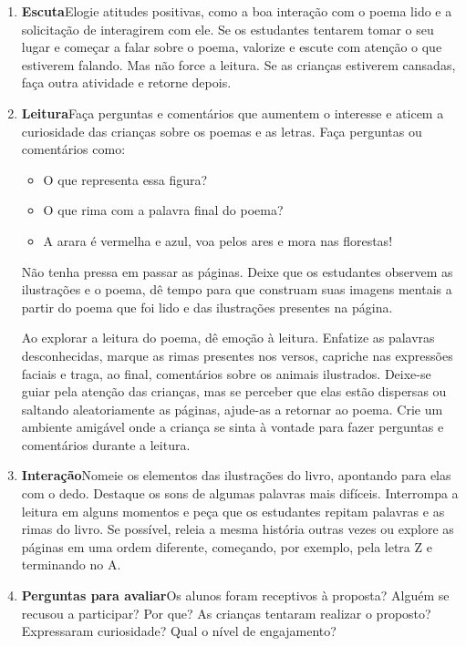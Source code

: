 \documentclass[11pt]{extarticle}
\begin{document}
\begin{enumerate}
\item \textbf{Escuta}\quad Elogie atitudes positivas, como 
a boa interação com o poema lido e a solicitação de interagirem com ele. Se os estudantes tentarem 
tomar o seu lugar e começar a falar sobre o poema, valorize e escute com atenção o que estiverem falando. Mas não 
force a leitura. Se as crianças estiverem cansadas, faça outra atividade 
e retorne depois. 



\item \textbf{Leitura}\quad Faça perguntas e comentários que aumentem o 
interesse e aticem a curiosidade das crianças sobre os poemas e as letras. Faça 
perguntas ou comentários como: 

\begin{itemize}
\item O que representa essa figura?
\item O que rima com a palavra final do poema?
\item A arara é vermelha e azul, voa pelos ares e mora nas florestas!
\end{itemize}

Não tenha pressa em passar as páginas. Deixe que os estudantes 
observem as ilustrações e o poema, dê tempo para que construam suas imagens 
mentais a partir do poema que foi lido e das ilustrações presentes na página. 

Ao explorar a leitura do poema, dê emoção 
à leitura. Enfatize as palavras desconhecidas, marque as rimas presentes nos versos,
capriche nas expressões faciais e traga, ao final, comentários sobre os animais ilustrados.
Deixe-se guiar pela atenção das crianças, mas se perceber que 
elas estão dispersas ou saltando aleatoriamente as páginas, ajude-as 
a retornar ao poema. Crie um ambiente amigável onde a criança 
se sinta à vontade para fazer perguntas e comentários durante a leitura.

\item \textbf{Interação}\quad Nomeie os elementos das ilustrações 
do livro, apontando para elas com o dedo. Destaque os sons de algumas 
palavras mais difíceis. Interrompa a leitura em alguns momentos e peça que 
os estudantes repitam palavras e as rimas do livro. Se possível, 
releia a mesma história outras vezes ou explore as páginas em uma ordem 
diferente, começando, por exemplo, pela letra Z e terminando no A. 

\item \textbf{Perguntas para avaliar}\quad Os alunos foram receptivos à proposta? Alguém se recusou a participar? Por que? As crianças tentaram realizar o proposto?  Expressaram curiosidade? Qual o nível de engajamento?
\end{enumerate}
\end{document}
